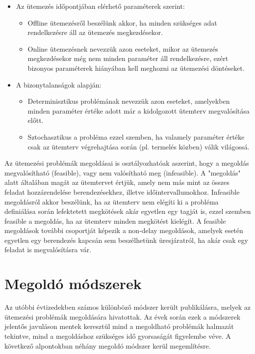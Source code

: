 \begin{itemize}
\item Az ütemezés időpontjában elérhető paraméterek szerint:
\begin{itemize}
\item Offline ütemezésről beszélünk akkor, ha minden szükséges adat rendelkezésre áll az ütemezés megkezdésekor.
\item Online ütemezésnek nevezzük azon eseteket, mikor az ütemezés megkezdésekor még nem minden paraméter áll rendelkezésre, ezért bizonyos paraméterek hiányában kell meghozni az ütemezési döntéseket.
\end{itemize} 
\item A bizonytalanságok alapján:
\begin{itemize}
\item Determinisztikus problémának nevezzük azon eseteket, amelyekben minden paraméter értéke adott már a kidolgozott ütemterv megvalósítása előtt.
\item Sztochasztikus a probléma ezzel szemben, ha valamely paraméter értéke csak az ütemterv végrehajtása során (pl. termelés közben) válik világossá.
\end{itemize}
\end{itemize}
Az ütemezési problémák megoldásai is osztályozhatóak aszerint, hogy a megoldás megvalósítható (feasible), vagy nem valósítható meg (infeasible).
A "megoldás" alatt általában magát az ütemtervet értjük, amely nem más mint az összes feladat hozzárendelése berendezésekhez, illetve időintervallumokhoz.
Infeasible megoldásról akkor beszélünk, ha az ütemterv nem elégíti ki a probléma definiálása során lefektetett megkötések akár egyetlen egy tagját is, ezzel szemben feasible a megoldás, ha az ütemterv minden megkötést kielégít.
A feasible megoldások további csoportját képezik a non-delay megoldások, amelyek esetén egyetlen egy berendezés kapcsán sem beszélhetünk üresjáratról, ha akár csak egy feladat is megvalósításra vár.     
\section{Megoldó módszerek}
Az utóbbi évtizedekben számos különböző módszer került publikálásra, melyek az ütemezési problémák megoldására hivatottak.
Az évek során ezek a módszerek jelentős javuláson mentek keresztül mind a megoldható problémák halmazát tekintve, mind a megoldáshoz szükséges idő gyorsaságát figyelembe véve.
A következő alpontokban néhány megoldó módszer kerül megemlítésre.

